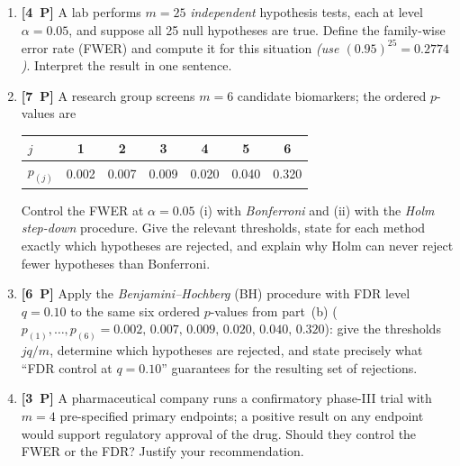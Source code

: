 \documentclass[11pt,a4paper]{article}
\newcommand{\pp}[1]{\textbf{[#1~P]}\enspace}
\begin{document}
\begin{enumerate}[label=(\alph*),leftmargin=7mm,itemsep=2.5mm]
  \item \pp{4} A lab performs $m=25$ \emph{independent} hypothesis tests, each at level
    $\alpha=0.05$, and suppose all 25 null hypotheses are true. Define the family-wise error
    rate (FWER) and compute it for this situation
    \emph{(use $(0.95)^{25}=0.2774$)}. Interpret the result in one sentence.
  \item \pp{7} A research group screens $m=6$ candidate biomarkers; the ordered $p$-values are
    \begin{center}
    \begin{tabular}{lcccccc}
    \toprule
    $j$ & 1 & 2 & 3 & 4 & 5 & 6\\
    \midrule
    $p_{(j)}$ & 0.002 & 0.007 & 0.009 & 0.020 & 0.040 & 0.320\\
    \bottomrule
    \end{tabular}
    \end{center}
    Control the FWER at $\alpha=0.05$ (i) with \emph{Bonferroni} and (ii) with the
    \emph{Holm step-down} procedure. Give the relevant thresholds, state for each method
    exactly which hypotheses are rejected, and explain why Holm can never reject fewer
    hypotheses than Bonferroni.
  \item \pp{6} Apply the \emph{Benjamini--Hochberg} (BH) procedure with FDR level $q=0.10$ to
    the same six ordered $p$-values from part~(b)
    ($p_{(1)},\dots,p_{(6)}=0.002,\,0.007,\,0.009,\,0.020,\,0.040,\,0.320$): give the
    thresholds $jq/m$, determine which hypotheses are rejected, and state precisely what
    ``FDR control at $q=0.10$'' guarantees for the resulting set of rejections.
  \item \pp{3} A pharmaceutical company runs a confirmatory phase-III trial with $m=4$
    pre-specified primary endpoints; a positive result on any endpoint would support regulatory
    approval of the drug. Should they control the FWER or the FDR? Justify your recommendation.
\end{enumerate}
\end{document}
